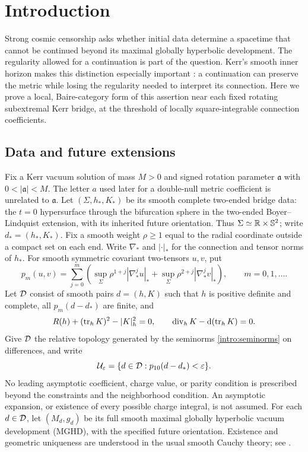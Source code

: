 \section{Introduction}\label{sec:introduction}

Strong cosmic censorship asks whether initial data determine a spacetime
that cannot be continued beyond its maximal globally hyperbolic
development. The regularity allowed for a continuation is part of the
question. Kerr's smooth inner horizon makes this distinction especially
important \cite{Carter1968}: a continuation can preserve the metric while losing the
regularity needed to interpret its connection. Here we prove a local,
Baire-category form of this assertion near each fixed rotating subextremal
Kerr bridge, at the threshold of locally square-integrable connection
coefficients.

\subsection{Data and future extensions}

Fix a Kerr vacuum solution of mass $M>0$ and signed rotation parameter
$\mathfrak a$ with $0<|\mathfrak a|<M$. The letter $a$ used later for a
double-null metric coefficient is unrelated to $\mathfrak a$.
Let $(\Sigma,h_*,K_*)$ be its smooth complete two-ended bridge data:
the $t=0$ hypersurface through the bifurcation sphere in the two-ended
Boyer--Lindquist extension, with its inherited future orientation.
Thus $\Sigma\simeq\mathbb R\times\mathbb S^2$; write $d_*=(h_*,K_*)$. Fix a smooth weight $\rho\ge1$
equal to the radial coordinate outside a compact set on each end.
Write $\nabla_*$ and $|\cdot|_*$ for the connection and tensor norms
of $h_*$. For smooth symmetric covariant two-tensors $u,v$, put
\begin{equation}\label{intro:seminorms}
 p_m(u,v)=\sum_{j=0}^m\left(
  \sup_\Sigma\rho^{1+j}|\nabla_*^j u|_*
  +\sup_\Sigma\rho^{2+j}|\nabla_*^j v|_*\right),
 \qquad m=0,1,\ldots.
\end{equation}
Let $\mathcal D$ consist of smooth pairs $d=(h,K)$ such that $h$ is
positive definite and complete, all $p_m(d-d_*)$ are finite, and
\begin{equation}\label{intro:constraints}
 R(h)+(\operatorname{tr}_h K)^2-|K|_h^2=0,
 \qquad \operatorname{div}_h K-\mathrm d(\operatorname{tr}_h K)=0.
\end{equation}
Give $\mathcal D$ the relative topology generated by the seminorms
\eqref{intro:seminorms} on differences, and write
\begin{equation}\label{intro:neighborhood}
 \mathcal U_{\varepsilon}=\{d\in\mathcal D:p_{10}(d-d_*)<\varepsilon\}.
\end{equation}
No leading asymptotic coefficient, charge value, or parity condition is
prescribed beyond the constraints and the neighborhood condition. An
asymptotic expansion, or existence of every possible charge integral,
is not assumed.
For each $d\in\mathcal D$, let $(M_d,g_d)$ be its full smooth maximal
globally hyperbolic vacuum development (MGHD), with the specified future
orientation. Existence and geometric uniqueness are understood in the
usual smooth Cauchy theory; see \cite{ChoquetBruhatGeroch1969}.


